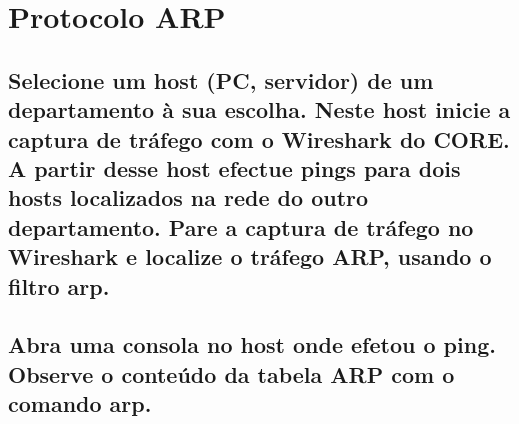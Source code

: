 \section{Protocolo ARP}
\subsection*{Selecione um host (PC, servidor) de um departamento à sua escolha. Neste host inicie a
captura de tráfego com o Wireshark do CORE. A partir desse host efectue pings para dois
hosts localizados na rede do outro departamento. Pare a captura de tráfego no
Wireshark e localize o tráfego ARP, usando o filtro arp.}

\subsection{Abra uma consola no host onde efetou o ping. Observe o conteúdo da tabela ARP
com o comando arp.}

